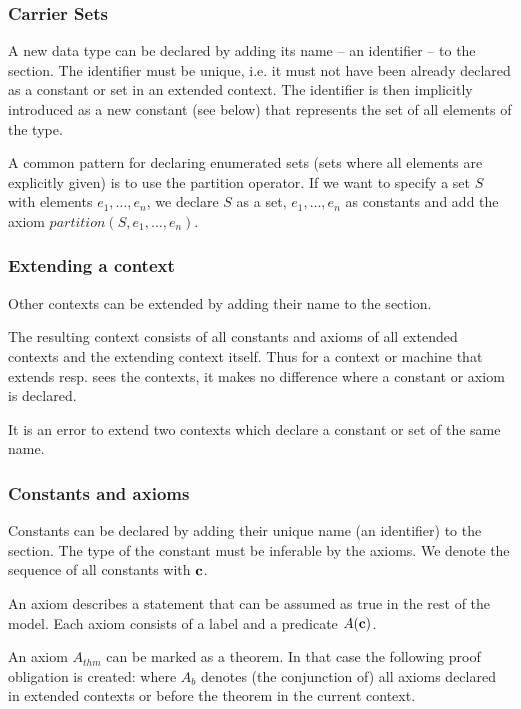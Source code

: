 \subsubsection{Carrier Sets}
\label{sets}
A new data type can be declared by adding its name -- an identifier -- to the  section.
The identifier must be unique, i.e. it must not have been already declared as a constant or set in an extended context.
The identifier is then implicitly introduced as a new constant (see below) that represents the set of all elements of the type. 

A common pattern for declaring enumerated sets (sets where all elements are explicitly given)
is to use the partition operator. If we want to specify a set $S$ with elements $e_1,\ldots,e_n$,
we declare $S$ as a set, $e_1,\ldots,e_n$ as constants and add the axiom $partition(S,e_1,\ldots,e_n)$.

\subsubsection{Extending a context}
Other contexts can be extended by adding their name to the  section.

The resulting context consists of all constants and axioms of all extended contexts and the extending context itself.
Thus for a context or machine that extends resp. sees the contexts, it makes no difference where a constant or axiom is declared.

It is an error to extend two contexts which declare a constant or set of the same name.

\subsubsection{Constants and axioms}
\label{constants_and_axioms}
Constants can be declared by adding their unique name (an identifier) to the  section.
The type of the constant must be inferable by the axioms.
We denote the sequence of all constants with $\textbf{c}$.

An axiom describes a statement that can be assumed as true in the rest of the model.
Each axiom consists of a label and a predicate $A(\textbf{c})$.

An axiom $A_{thm}$ can be marked as a theorem. In that case the following proof obligation is created:
where $A_b$ denotes (the conjunction of) all axioms declared in extended contexts or before the theorem in the current context.

